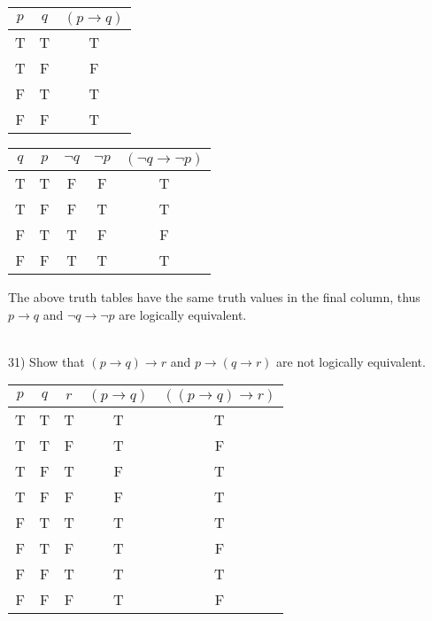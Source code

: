 \documentclass{article}
\begin{document}
\begin{flushleft}
\begin{table}[ht]

\begin{tabular}{|c|c||c|}

$ p $ & $ q $ & $ (p \rightarrow q) $ \\
\hline
T & T & T \\
\hline
T & F & F \\
\hline
F & T & T \\
\hline
F & F & T \\

\end{tabular}
\label{table:tt1}
\end{table}
\begin{table}[ht]
\begin{tabular}{|c|c||c|c|c|}

$ q $ & $ p $ & $  \neg q $ & $  \neg p $ & $ ( \neg q \rightarrow  \neg p) $ \\
\hline
T & T & F & F & T \\
\hline
T & F & F & T & T \\
\hline
F & T & T & F & F \\
\hline
F & F & T & T & T \\

\end{tabular}
\label{table:tt1}
\end{table}
The above truth tables have the same truth values in the final column, thus $p \rightarrow q$ and $\neg q \rightarrow \neg p$ are logically equivalent.

~\\\setlength\parindent{0pt}31) Show that $(p \rightarrow q) \rightarrow r$ and $p \rightarrow (q \rightarrow r)$ are not logically equivalent.

\begin{table}[ht]
\begin{tabular}{|c|c|c||c|c|}

$ p $ & $ q $ & $ r $ & $ (p \rightarrow q) $ & $ ((p \rightarrow q) \rightarrow r) $ \\
\hline
T & T & T & T & T \\
\hline
T & T & F & T & F \\
\hline
T & F & T & F & T \\
\hline
T & F & F & F & T \\
\hline
F & T & T & T & T \\
\hline
F & T & F & T & F \\
\hline
F & F & T & T & T \\
\hline
F & F & F & T & F \\


\end{tabular}
\end{table}
\end{flushleft}
\end{document}
